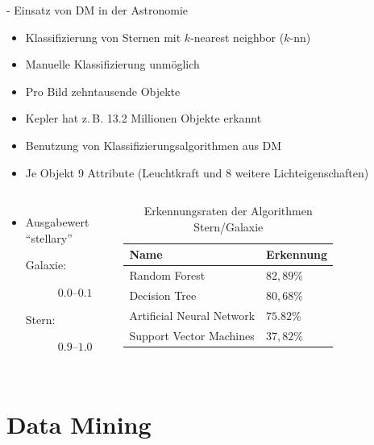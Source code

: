 \documentclass[fleqn,11pt,aspectratio=43]{beamer}
\begin{document}
\begin{frame}{\insertsectionhead - Einsatz von DM in der Astronomie}
\begin{itemize}
\item Klassifizierung von Sternen mit $k$-nearest neighbor ($k$-nn)
\item Manuelle Klassifizierung unmöglich  \cite{ester2000knowledge}
\item Pro Bild zehntausende Objekte
\item Kepler hat z.\,B. 13.2 Millionen Objekte erkannt
\item Benutzung von Klassifizierungsalgorithmen aus DM
\item Je Objekt 9 Attribute (Leuchtkraft und 8 weitere Lichteigenschaften)
\end{itemize}
\begin{columns}[onlytextwidth]
    	\vspace{-9.5em}
		\begin{itemize}
		\item Ausgabewert \enquote{stellary}
		\begin{description}
		\item[Galaxie:] $0.0$--$0.1$ 
		\item[Stern:] $0.9$--$1.0$ 
		\end{description}
		\end{itemize}
	    \begin{table}
	    \begin{tabular}{l|l}
	    Name & Erkennung\\ \hline
	    Random Forest & $82,89\%$ \\
	    Decision Tree & $80,68\%$ \\
	    Artificial Neural Network & $75.82\%$ \\
	    Support Vector Machines & $37,82\%$ \\
	    \end{tabular}
	    \caption{Erkennungsraten der Algorithmen Stern/Galaxie \cite{o2009star}}
	    \end{table}
\end{columns}
\end{frame}

\section{Data Mining~}
\end{document}
